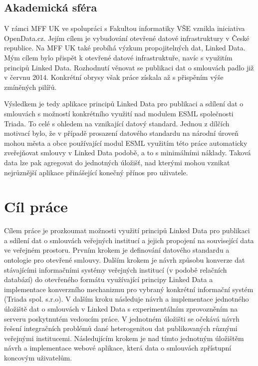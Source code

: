 \subsection*{Akademická sféra}

V rámci MFF UK ve spolupráci s Fakultou informatiky VŠE vznikla iniciativa OpenData.cz. Jejím cílem je vybudování otevřené datové infrastruktury v České republice. Na MFF UK také probíhá výzkum propojitelných dat, Linked Data. Mým cílem bylo přispět k otevřené datové infrastruktuře, navíc s využitím principů Linked Data. Rozhodnutí věnovat se publikaci dat o smlouvách padlo již v červnu 2014. Konkrétní obrysy však práce získala až s přispěním výše zmíněných pilířů.

Výsledkem je tedy aplikace principů Linked Data pro publikaci a sdílení dat o smlouvách s možností konkrétního využití nad modulem ESML společnosti Triada. To celé s ohledem na vznikající datový standard. Jednou z dílčích motivací bylo, že v případě prosazení datového standardu na národní úroveň mohou města a obce používající modul ESML využitím této práce automaticky zveřejňovat smlouvy v Linked Data podobě, a to s minimálními náklady. Taková data lze pak agregovat do jednotných úložišť, nad kterými mohou vznikat nejrůznější aplikace přinášející konečný přínos pro uživatele.

\section{Cíl práce}

Cílem práce je prozkoumat možnosti využití principů Linked Data pro publikaci a sdílení dat o smlouvách veřejných institucí a jejich propojení na související data ve veřejném prostoru. Prvním krokem je definování datového standardu a ontologie pro otevřené smlouvy. Dalším krokem je návrh způsobu konverze dat stávajícími informačními systémy veřejných institucí (v podobě relačních databází) do otevřeného formátu využívající principy Linked Data a implementace konverzního mechanizmu pro vybraný konkrétní informační systém (Triada spol. s.r.o). V dalším kroku následuje návrh a implementace jednotného úložiště dat o smlouvách v Linked Data s experimentálním zprovozněním na serveru poskytnutém vedoucím práce. V jednotném úložišti se očekává návrh řešení integračních problémů dané heterogenitou dat publikovaných různými veřejnými institucemi. Následujícím krokem je nad tímto jednotným úložištěm návrh a implementace webové aplikace, která data o smlouvách zpřístupní koncovým uživatelům.

